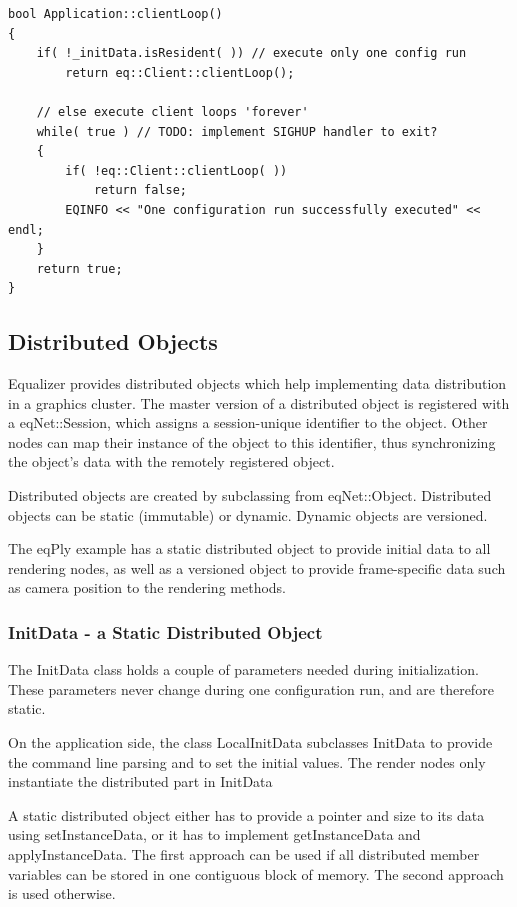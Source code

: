 \documentclass[10pt,a4]{scrartcl}
\begin{document}
{\footnotesize\begin{lstlisting}
bool Application::clientLoop()
{
    if( !_initData.isResident( )) // execute only one config run
        return eq::Client::clientLoop();

    // else execute client loops 'forever'
    while( true ) // TODO: implement SIGHUP handler to exit?
    {
        if( !eq::Client::clientLoop( ))
            return false;
        EQINFO << "One configuration run successfully executed" << endl;
    }
    return true;
}
\end{lstlisting}}%


\subsection{Distributed Objects}

Equalizer provides distributed objects which help implementing data
distribution in a graphics cluster. The master version of a distributed
object is registered with a \textsf{eqNet::Session}, which assigns a
session-unique identifier to the object. Other nodes can map their
instance of the object to this identifier, thus synchronizing the
object's data with the remotely registered object.

Distributed objects are created by subclassing from
\textsf{eqNet::Object}. Distributed objects can be static (immutable) or
dynamic. Dynamic objects are versioned.

The \textsf{eqPly} example has a static distributed object to provide
initial data to all rendering nodes, as well as a versioned object to
provide frame-specific data such as camera position to the
rendering methods.

\subsubsection{\label{sInitData}InitData - a Static Distributed Object}

The \textsf{InitData} class holds a couple of parameters needed during
initialization. These parameters never change during one configuration
run, and are therefore static.

On the application side, the class \textsf{LocalInitData} subclasses
\textsf{InitData} to provide the command line parsing and to set the
initial values. The render nodes only instantiate the distributed part
in \textsf{InitData}

A static distributed object either has to provide a pointer and size to
its data using \textsf{setInstanceData}, or it has to implement
\textsf{getInstanceData} and \textsf{applyInstanceData}. The first
approach can be used if all distributed member variables can be stored
in one contiguous block of memory. The second approach is used
otherwise.
\end{document}
